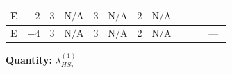 \documentclass[8pt]{article}
\begin{document}
\begin{landscape}
\begin{longtable}{@{}llcccccc >{\raggedright\arraybackslash}p{0.21\linewidth} >{\raggedright\arraybackslash}p{0.21\linewidth} >{\raggedright\arraybackslash}p{0.21\linewidth}@{}}
\midrule
E & $-2$ & $3$ & $\text{N/A}$ & $3$ & $\text{N/A}$ & $2$ & $\text{N/A}$ & \scriptsize\adjustbox{max width=\linewidth}{$\begin{gathered} +8 {\lambda_{HS_2}^{(1)}} {\lambda_{S_2}^{(1)}}\end{gathered}$} & \scriptsize\adjustbox{max width=\linewidth}{$\begin{gathered} +6 {\lambda_{HS_2}^{(A)}}^2\end{gathered}$} & \scriptsize\adjustbox{max width=\linewidth}{$\begin{gathered} +20 {\lambda_{X_{2}}} \left({\lambda_{X_{16}}}\right)^{*}\end{gathered}$} \\
\midrule
E & $-4$ & $3$ & $\text{N/A}$ & $3$ & $\text{N/A}$ & $2$ & $\text{N/A}$ & \scriptsize\adjustbox{max width=\linewidth}{$\begin{gathered} +8 {\lambda_{HS_2}^{(1)}} {\lambda_{S_2}^{(1)}}\end{gathered}$} & \scriptsize\adjustbox{max width=\linewidth}{$\begin{gathered} +6 {\lambda_{HS_2}^{(A)}}^2\end{gathered}$} & --- \\
\midrule
\bottomrule
\end{longtable}
\clearpage
\noindent\textbf{Quantity: }$\lambda_{HS_2}^{(1)}$\par\smallskip

\end{landscape}
\end{document}
